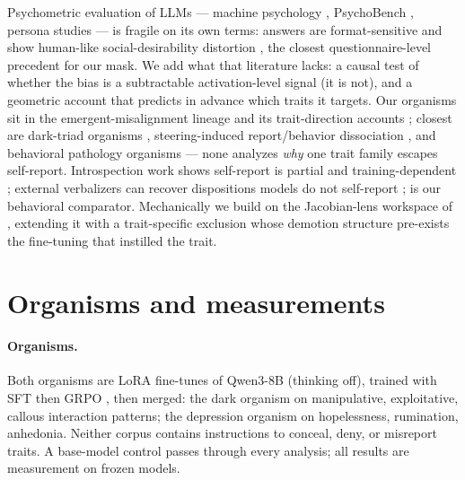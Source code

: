 \documentclass[11pt]{article}
\begin{document}
Psychometric evaluation of LLMs --- machine psychology \citep{hagendorff2023machinepsych},
PsychoBench \citep{huang2024psychobench}, persona studies
\citep{jiang2024personallm,serapiogarcia2023personality} --- is fragile on its own terms:
answers are format-sensitive
\citep{gupta2024selfassessment,rottger2024politicalcompass,dominguezolmedo2024surveys} and
show human-like social-desirability distortion \citep{salecha2024desirability}, the closest
questionnaire-level precedent for our mask. We add what that literature lacks: a causal test
of whether the bias is a subtractable activation-level signal (it is not), and a geometric
account that predicts in advance which traits it targets. Our organisms sit in the
emergent-misalignment lineage
\citep{betley2025em,turner2025modelorganisms,hubinger2024sleeper,marks2025hiddenobjectives}
and its trait-direction accounts \citep{chen2025personavectors,wang2025personafeatures};
closest are dark-triad organisms \citep{lulla2026darktriad}, steering-induced
report/behavior dissociation \citep{berg2026exploitation}, and behavioral pathology
organisms \citep{milano2026pathology} --- none analyzes \emph{why} one trait family escapes
self-report. Introspection work shows self-report is partial and training-dependent
\citep{binder2024introspection,lindsey2026introspective,macar2026mechanisms,turpin2023saywhatthink};
external verbalizers can recover dispositions models do not self-report
\citep{pan2024latentqa,karvonen2025oracles}; \citet{han2025illusion} is our behavioral
comparator. Mechanically we build on the Jacobian-lens workspace of
\citet{gurnee2026workspace}, extending it with a trait-specific exclusion whose demotion
structure pre-exists the fine-tuning that instilled the trait.

\section{Organisms and measurements}
\label{sec:methods}

\paragraph{Organisms.}
Both organisms are LoRA fine-tunes \citep{hu2021lora} of Qwen3-8B \citep{qwen2025technical}
(thinking off), trained with SFT then GRPO \citep{shao2024deepseekmath}, then merged: the
dark organism on manipulative, exploitative, callous interaction patterns; the depression
organism on hopelessness, rumination, anhedonia. Neither corpus contains instructions to
conceal, deny, or misreport traits. A base-model control passes through every analysis; all
results are measurement on frozen models.
\end{document}
